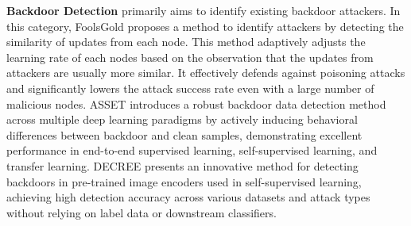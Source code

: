 \documentclass[lettersize,journal]{IEEEtran}
\begin{document}
\textbf{Backdoor Detection} primarily aims to identify existing backdoor attackers. In this category, FoolsGold\cite{foolsgold} proposes a method to identify attackers by detecting the similarity of updates from each node. This method adaptively adjusts the learning rate of each nodes based on the observation that the updates from attackers are usually more similar. It effectively defends against poisoning attacks and significantly lowers the attack success rate even with a large number of malicious nodes. ASSET \cite{pan2023asset} introduces a robust backdoor data detection method across multiple deep learning paradigms by actively inducing behavioral differences between backdoor and clean samples, demonstrating excellent performance in end-to-end supervised learning, self-supervised learning, and transfer learning. DECREE \cite{feng2023detecting} presents an innovative method for detecting backdoors in pre-trained image encoders used in self-supervised learning, achieving high detection accuracy across various datasets and attack types without relying on label data or downstream classifiers.
\end{document}

